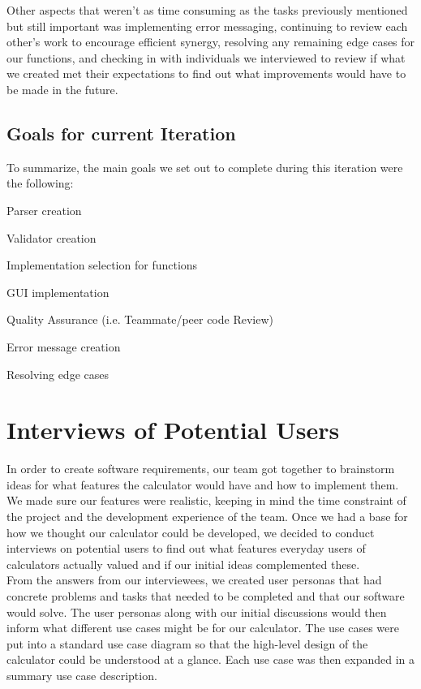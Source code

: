 \documentclass[a4paper, 12pt]{article}
\begin{document}
Other aspects that weren’t as time consuming as the tasks previously mentioned but still important was implementing error messaging, continuing to review each other's work to encourage efficient synergy, resolving any remaining edge cases for our functions, and checking in with individuals we interviewed to review if what we created met their expectations to find out what improvements would have to be made in the future. 




\subsection{Goals for current Iteration}

To summarize, the main goals we set out to complete during this iteration were the following:
\\

\begin{compactitem}
\item Parser creation
\item Validator creation
\item Implementation selection for functions
\item GUI implementation
\item Quality Assurance (i.e. Teammate/peer code Review)
\item Error message creation
\item Resolving edge cases
\end{compactitem}



\section{Interviews of Potential Users}

In order to create software requirements, our team got together to brainstorm ideas for what features the calculator would have and how to implement them. We made sure our features were realistic, keeping in mind the time constraint of the project and the development experience of the team. Once we had a base for how we thought our calculator could be developed, we decided to conduct interviews on potential users to find out what features everyday users of calculators actually valued and if our initial ideas complemented these. \\

From the answers from our interviewees, we created user personas that had concrete problems and tasks that needed to be completed and that our software would solve. The user personas along with our initial discussions would then inform what different use cases might be for our calculator. The use cases were put into a standard use case diagram so that the high-level design of the calculator could be understood at a glance. Each use case was then expanded in a summary use case description.
\\
\end{document}

